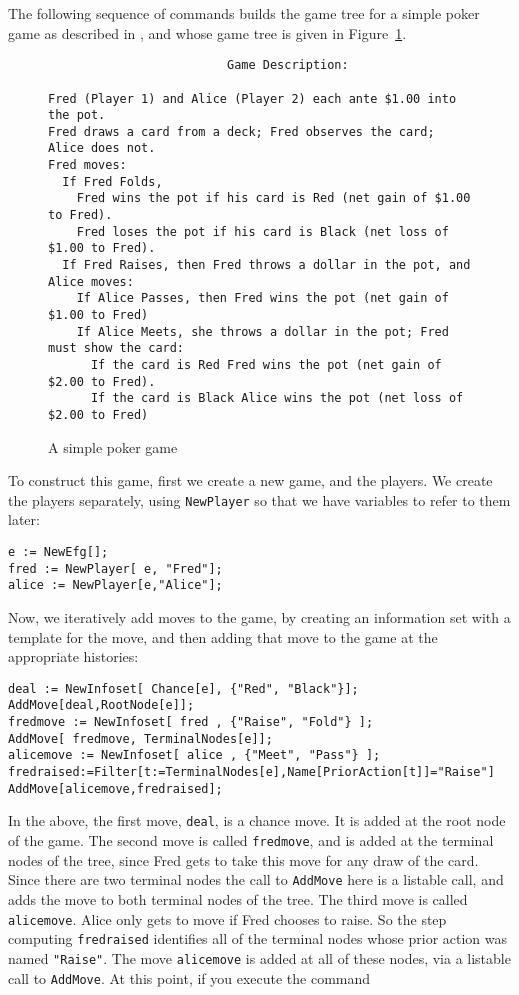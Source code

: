 The following sequence of commands builds the game tree for a simple
poker game as described in \cite{Mye:91}, and whose game tree is given
in Figure~\ref{fig:poker}.  

\begin{figure}[htp]
\label{fig:poker}
\vspace{.25in}
\begin{verbatim} 
                         Game Description:

Fred (Player 1) and Alice (Player 2) each ante $1.00 into the pot.
Fred draws a card from a deck; Fred observes the card; Alice does not. 
Fred moves:
  If Fred Folds, 
    Fred wins the pot if his card is Red (net gain of $1.00 to Fred).
    Fred loses the pot if his card is Black (net loss of $1.00 to Fred).
  If Fred Raises, then Fred throws a dollar in the pot, and Alice moves:
    If Alice Passes, then Fred wins the pot (net gain of $1.00 to Fred)
    If Alice Meets, she throws a dollar in the pot; Fred must show the card: 
      If the card is Red Fred wins the pot (net gain of $2.00 to Fred).
      If the card is Black Alice wins the pot (net loss of $2.00 to Fred)
\end{verbatim}
\caption{A simple poker game}
\end{figure}
\medskip

To construct this game, first we create a new game, and the players.
We create the players separately, using \verb+NewPlayer+ so that we
have variables to refer to them later:

\begin{verbatim}
e := NewEfg[];
fred := NewPlayer[ e, "Fred"];
alice := NewPlayer[e,"Alice"];
\end{verbatim}

Now, we iteratively add moves to the game, by creating an information
set with a template for the move, and then adding that move to the
game at the appropriate histories: 

\begin{verbatim}
deal := NewInfoset[ Chance[e], {"Red", "Black"}];
AddMove[deal,RootNode[e]];
fredmove := NewInfoset[ fred , {"Raise", "Fold"} ];
AddMove[ fredmove, TerminalNodes[e]];
alicemove := NewInfoset[ alice , {"Meet", "Pass"} ];
fredraised:=Filter[t:=TerminalNodes[e],Name[PriorAction[t]]="Raise"]
AddMove[alicemove,fredraised];
\end{verbatim}

In the above, the first move, \verb+deal+, is a chance move. It is
added at the root node of the game.  The second move is called
\verb+fredmove+, and is added at the terminal nodes of the tree, since
Fred gets to take this move for any draw of the card.  Since there are
two terminal nodes the call to \verb+AddMove+  here is a listable call,
and adds the move to both terminal nodes of the tree.  The third move
is called \verb+alicemove+.  Alice only gets to move if Fred chooses
to raise.  So the step computing \verb+fredraised+ identifies all of
the terminal nodes whose prior action was named \verb+"Raise"+.  The
move \verb+alicemove+ is added at all of these nodes, via a listable
call to \verb+AddMove+.  At this point, if you execute the command

